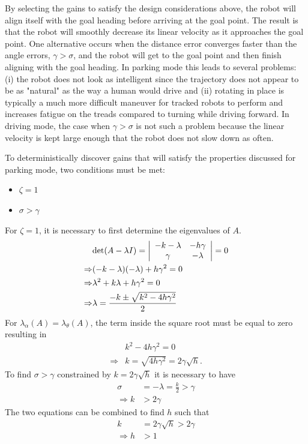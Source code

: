 By selecting the gains to satisfy the design considerations above, the robot will align itself with the goal heading before arriving at the goal point. The result is that the robot will smoothly decrease its linear velocity as it approaches the goal point. One alternative occurs when the distance error converges faster than the angle errors, $\gamma>\sigma$, and the robot will get to the goal point and then finish aligning with the goal heading. In parking mode this leads to several problems: (i) the robot does not look as intelligent since the trajectory does not appear to be as "natural" as the way a human would drive and (ii) rotating in place is typically a much more difficult maneuver for tracked robots to perform and increases fatigue on the treads compared to turning while driving forward. In driving mode, the case when $\gamma>\sigma$ is not such a problem because the linear velocity is kept large enough that the robot does not slow down as often.

To deterministically discover gains that will satisfy the properties discussed for parking mode, two conditions must be met:
\begin{itemize}
\item $\zeta = 1$
\item $\sigma > \gamma$
\end{itemize}
For $\zeta=1$, it is necessary to first determine the eigenvalues of $A$.
\begin{align*}
&\text{det}(A-\lambda I) = \left|\begin{array}{c c} -k-\lambda & -h\gamma \\ \gamma & -\lambda\end{array}\right| = 0 \\
\Rightarrow &(-k-\lambda)(-\lambda)+h\gamma^2 = 0 \\
\Rightarrow &\lambda^2 + k\lambda + h\gamma^2 = 0 \\
\Rightarrow &\lambda = \frac{-k\pm\sqrt{k^2-4h\gamma^2}}{2}
\end{align*}
For $\lambda_\alpha(A)=\lambda_\theta(A)$, the term inside the square root must be equal to zero resulting in
\begin{align*}
&k^2 - 4h\gamma^2 = 0 \\
\Rightarrow &k = \sqrt{4h\gamma^2} = 2\gamma\sqrt{h}.
\end{align*}
To find $\sigma>\gamma$ constrained by $k=2\gamma\sqrt{h}$ it is necessary to have
\begin{align*}
\sigma &= -\lambda = \tfrac{k}{2} > \gamma \\
\Rightarrow k &> 2\gamma
\end{align*}
The two equations can be combined to find $h$ such that
\begin{align*}
k &= 2\gamma\sqrt{h} > 2\gamma \\
\Rightarrow h &> 1
\end{align*}

